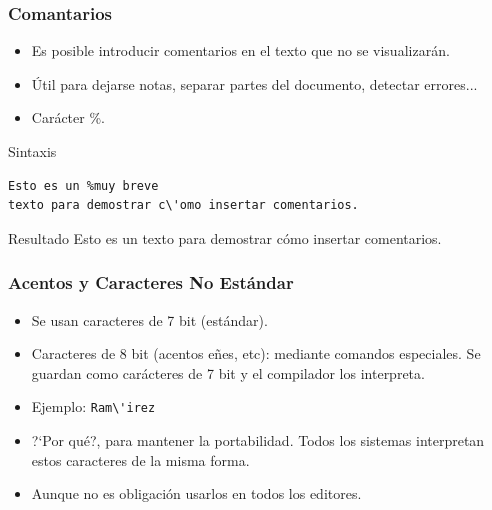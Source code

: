 \documentclass[aspectratio=169]{beamer}%
\begin{document}
\begin{frame}[fragile]
\frametitle{\textbf{Comantarios}}
\justifying
 \begin{itemize}\justifying
  \item Es posible introducir comentarios en el texto que no se visualizarán.
  \item Útil para dejarse notas, separar partes del documento, detectar errores...
  \item Carácter \%.
\end{itemize}

\begin{block}{Sintaxis}
   \vspace{-0.3cm}
\begin{lstlisting}
Esto es un %muy breve
texto para demostrar c\'omo insertar comentarios.
\end{lstlisting}\vspace{-0.3cm}

\end{block}

\begin{exampleblock}{Resultado}
Esto es un %
texto para demostrar c\'omo insertar comentarios.
\end{exampleblock}


\end{frame}

\begin{frame}[fragile]
\frametitle{\textbf{Acentos y Caracteres No Estándar}}
\justifying
 \begin{itemize}\justifying
  \item Se usan caracteres de 7 bit (estándar).
  \item Caracteres de 8 bit (acentos eñes, etc): mediante comandos especiales. Se guardan como carácteres de 7 bit y el compilador los interpreta.
  \item Ejemplo: \verb+Ram\'irez+
  \item ?`Por qué?, para mantener la portabilidad. Todos los sistemas interpretan estos caracteres de la misma forma.
  \item Aunque no es obligación usarlos en todos los editores.
\end{itemize}

\end{frame}
\end{document}
